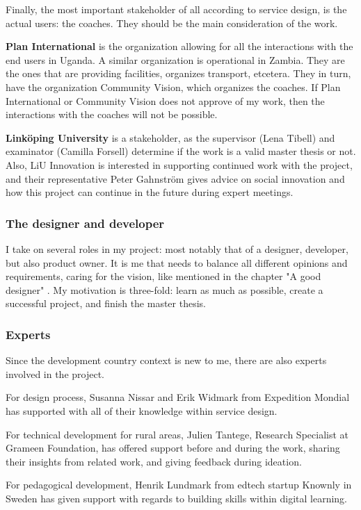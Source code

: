 Finally, the most important stakeholder of all according to service design, is the actual users: the coaches. They should be the main consideration of the work.

\textbf{Plan International} is the organization allowing for all the interactions with the end users in Uganda. A similar organization is operational in Zambia. They are the ones that are providing facilities, organizes transport, etcetera. They in turn, have the organization Community Vision, which organizes the coaches. If Plan International or Community Vision does not approve of my work, then the interactions with the coaches will not be possible.

\textbf{Linköping University} is a stakeholder, as the supervisor (Lena Tibell) and examinator (Camilla Forsell) determine if the work is a valid master thesis or not. Also, LiU Innovation is interested in supporting continued work with the project, and their representative Peter Gahnström gives advice on social innovation and how this project can continue in the future during expert meetings.

\subsubsection{The designer and developer}
I take on several roles in my project: most notably that of a designer, developer, but also product owner. It is me that needs to balance all different opinions and requirements, caring for the vision, like mentioned in the chapter "A good designer" . My motivation is three-fold: learn as much as possible, create a successful project, and finish the master thesis.

\subsubsection{Experts}
Since the development country context is new to me, there are also experts involved in the project.

For design process, Susanna Nissar and Erik Widmark from Expedition Mondial has supported with all of their knowledge within service design.

For technical development for rural areas, Julien Tantege, Research Specialist at Grameen Foundation, has offered support before and during the work, sharing their insights from related work, and giving feedback during ideation.

For pedagogical development, Henrik Lundmark from edtech startup Knownly in Sweden has given support with regards to building skills within digital learning.
